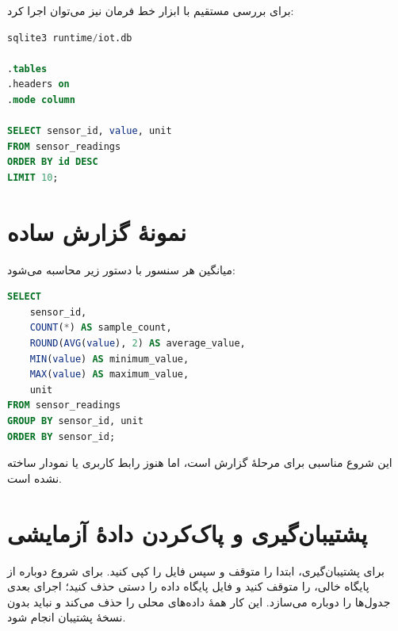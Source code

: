 برای بررسی مستقیم با ابزار خط فرمان
نیز می‌توان اجرا کرد:

\begin{LTR}
\begin{lstlisting}[language=SQL]
sqlite3 runtime/iot.db

.tables
.headers on
.mode column

SELECT sensor_id, value, unit
FROM sensor_readings
ORDER BY id DESC
LIMIT 10;
\end{lstlisting}
\end{LTR}

\section{نمونهٔ گزارش ساده}
میانگین هر سنسور با دستور زیر محاسبه می‌شود:

\begin{LTR}
\begin{lstlisting}[language=SQL]
SELECT
    sensor_id,
    COUNT(*) AS sample_count,
    ROUND(AVG(value), 2) AS average_value,
    MIN(value) AS minimum_value,
    MAX(value) AS maximum_value,
    unit
FROM sensor_readings
GROUP BY sensor_id, unit
ORDER BY sensor_id;
\end{lstlisting}
\end{LTR}

این
شروع مناسبی برای مرحلهٔ گزارش است، اما هنوز رابط کاربری یا نمودار ساخته نشده است.

\section{پشتیبان‌گیری و پاک‌کردن دادهٔ آزمایشی}
برای پشتیبان‌گیری، ابتدا
را متوقف و سپس فایل
را کپی کنید. برای شروع دوباره از پایگاه خالی،
را متوقف کنید و فایل پایگاه داده را دستی حذف کنید؛ اجرای بعدی جدول‌ها را دوباره می‌سازد. این کار همهٔ داده‌های محلی را حذف می‌کند و نباید بدون نسخهٔ پشتیبان انجام شود.
